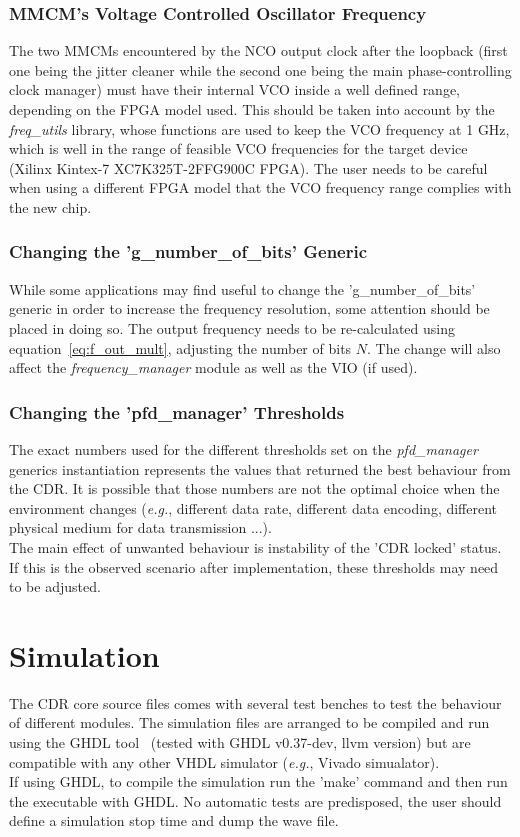 \documentclass[11pt]{article}
\renewcommand{\>}{\rangle} \renewcommand{\emptyset}{\varnothing}
\begin{document}
\subsubsection{MMCM's Voltage Controlled Oscillator Frequency}
The two MMCMs encountered by the NCO output clock after the loopback (first one
being the jitter cleaner while the second one being the main phase-controlling
clock manager) must have their internal VCO inside a well defined range,
depending on the FPGA model used. This should be taken into account by the
\textit{freq\_utils} library, whose functions are used to keep the VCO frequency
at 1 GHz, which is well in the range of feasible VCO frequencies for the target
device (Xilinx Kintex-7 XC7K325T-2FFG900C FPGA). The user needs to be careful
when using a different FPGA model that the VCO frequency range complies with the
new chip.

\subsubsection{Changing the 'g\_number\_of\_bits' Generic}
While some applications may find useful to change the 'g\_number\_of\_bits'
generic in order to increase the frequency resolution, some attention should be
placed in doing so. The output frequency needs to be re-calculated using
equation~\ref{eq:f_out_mult}, adjusting the number of bits $N$. The change will
also affect the \textit{frequency\_manager} module as well as the VIO (if used).

\subsubsection{Changing the 'pfd\_manager' Thresholds}
The exact numbers used for the different thresholds set on the
\textit{pfd\_manager} generics instantiation represents the values that returned
the best behaviour from the CDR. It is possible that those numbers are not the
optimal choice when the environment changes (\textit{e.g.}, different data rate,
different data encoding, different physical medium for data transmission ...).\\
The main effect of unwanted behaviour is instability of the 'CDR locked' status.
If this is the observed scenario after implementation, these thresholds may need
to be adjusted.

\section{Simulation}
The CDR core source files comes with several test benches to test the behaviour
of different modules. The simulation files are arranged to be compiled and run
using the GHDL tool~\cite{ref:ghdl} (tested with GHDL v0.37-dev, llvm version)
but are compatible
with any other VHDL simulator (\textit{e.g.}, Vivado simualator).\\
If using GHDL, to compile the simulation run the 'make' command and then run the
executable with GHDL. No automatic tests are predisposed, the user should define
a simulation stop time and dump the wave file.
\end{document}

